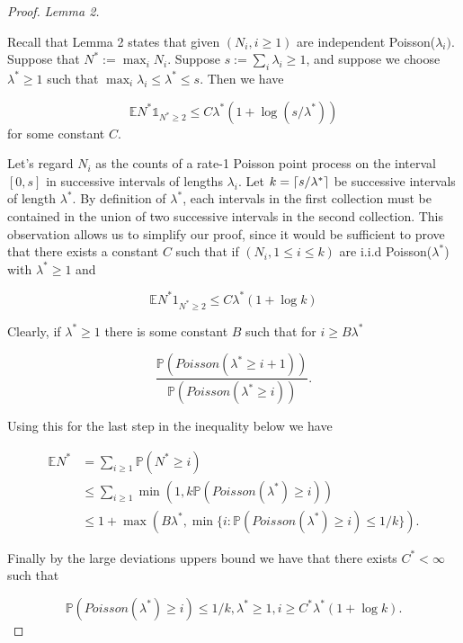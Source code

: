 \begin{proof}\textit{Lemma 2.}


Recall that Lemma 2 states that given $(N_i, i\geq 1)$ are independent Poisson($\lambda_i)$. Suppose that $N^* := \max_i N_i$. Suppose $s:=\sum_i\lambda_i \geq 1$, and suppose we choose $\lambda^* \geq 1$ such that $\max_i\lambda_i \leq \lambda^* \leq s$.  Then we have
\begin{center}
$$\mathbb{E}N^*\mathbb{1}_{N^*\geq 2} \leq C \lambda^* (1+\log(s/\lambda^*)) $$ for some constant $C$.  
\end{center}

Let's regard $N_i$ as the counts of a rate-1 Poisson point process on the interval $[0,s]$ in successive intervals of lengths $\lambda_i$.  Let $k = \ceil*{s/\lambda^*}$  be successive intervals of length $\lambda^*$.  By definition of $\lambda^*$, each intervals in the first collection must be contained in the union of two successive intervals in the second collection.  This observation allows us to simplify our proof, since it would be sufficient to prove that there exists a constant $C$ such that if $(N_i, 1 \leq i \leq k)$ are i.i.d Poisson($\lambda^*$) with $\lambda^* \geq 1$ and 

$$ \mathbb{E}N^*1_{N^* \geq 2} \leq C \lambda^* (1+\log{k})$$

Clearly, if $\lambda^* \geq 1$ there is some constant $B$ such that for $i \geq B \lambda^*$

$$ \frac{\mathbb{P}(Poisson(\lambda^* \geq i+1))}{\mathbb{P}(Poisson(\lambda^* \geq i))}.$$

Using this for the last step in the inequality below we have 

\begin{equation}
\begin{split}
\mathbb{E}N^* &= \sum_{i \geq 1}\mathbb{P}(N^* \geq i)\\
 &\leq \sum_{i \geq 1} \min (1, k\mathbb{P}(Poisson(\lambda^*) \geq i))\\
&\leq 1 + \max(B\lambda^*, \min \{ i: \mathbb{P}(Poisson(\lambda^*) \geq i) \leq 1/k\}).
\end{split}
\end{equation}

Finally by the large deviations uppers bound we have that there exists $C^* < \infty$ such that 

$$  \mathbb{P}(Poisson(\lambda^*) \geq i) \leq 1/k, \lambda^* \geq 1, i \geq C^* \lambda^* (1+ \log k).$$
\end{proof}
